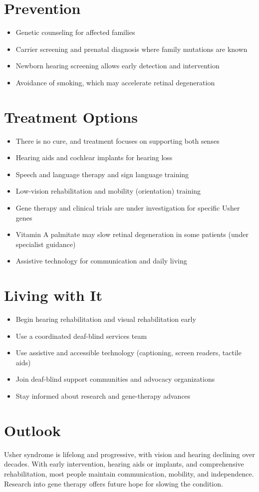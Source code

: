 \section{Prevention}
\begin{itemize}[noitemsep]
  \item Genetic counseling for affected families
  \item Carrier screening and prenatal diagnosis where family mutations are known
  \item Newborn hearing screening allows early detection and intervention
  \item Avoidance of smoking, which may accelerate retinal degeneration
\end{itemize}
\section{Treatment Options}
\begin{itemize}[noitemsep]
  \item There is no cure, and treatment focuses on supporting both senses
  \item Hearing aids and cochlear implants for hearing loss
  \item Speech and language therapy and sign language training
  \item Low-vision rehabilitation and mobility (orientation) training
  \item Gene therapy and clinical trials are under investigation for specific Usher genes
  \item Vitamin A palmitate may slow retinal degeneration in some patients (under specialist guidance)
  \item Assistive technology for communication and daily living
\end{itemize}
\section{Living with It}
\begin{itemize}[noitemsep]
  \item Begin hearing rehabilitation and visual rehabilitation early
  \item Use a coordinated deaf-blind services team
  \item Use assistive and accessible technology (captioning, screen readers, tactile aids)
  \item Join deaf-blind support communities and advocacy organizations
  \item Stay informed about research and gene-therapy advances
\end{itemize}
\section{Outlook}
Usher syndrome is lifelong and progressive, with vision and hearing declining over decades. With early intervention, hearing aids or implants, and comprehensive rehabilitation, most people maintain communication, mobility, and independence. Research into gene therapy offers future hope for slowing the condition.
